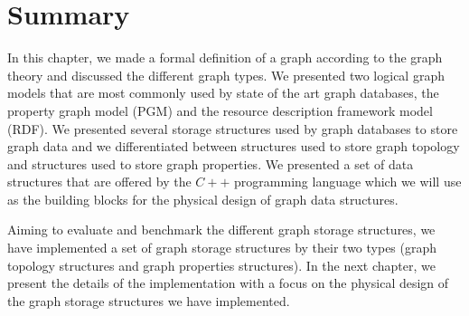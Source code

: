 {\section{Summary}
\label{sec:BackgroundSummary}

In this chapter, we made a formal definition of a graph according to the graph theory and discussed the different graph types. We presented two logical graph models that are most commonly used  by state of the art graph databases, the property graph model (PGM) and the resource description framework model (RDF). We presented several storage structures used by graph databases to store graph data and we differentiated between structures used to store graph topology and structures used to store graph properties. We presented a set of data structures that are offered by the $C++$ programming language which we will use as the building blocks for the physical design of graph data structures.

Aiming to evaluate and benchmark the different graph storage structures, we have implemented a set of graph storage structures by their two types (graph topology structures and graph properties structures). In the next chapter, we present the details of the implementation with a focus on the physical design of the graph storage structures we have implemented.

}
